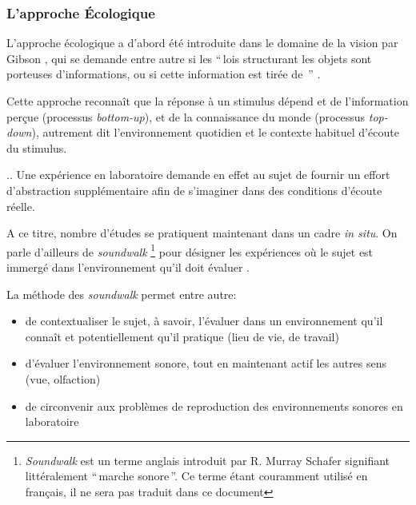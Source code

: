 \subsubsection{L'approche Écologique}
\label{sec:ecologique}

L'approche écologique a d'abord été introduite dans le domaine de la vision par Gibson \citep{gibson1966senses}, qui se demande entre autre si les ``\,lois structurant les objets sont porteuses d'informations, ou si cette information est tirée de \,'' \citep{gibson1978ecological}.

Cette approche reconnaît que la réponse à un stimulus dépend et de l'information perçue (processus \emph{bottom-up}), et de la connaissance du monde (processus \emph{top-down}), autrement dit l'environnement quotidien et le contexte habituel d'écoute du stimulus.

.. Une expérience en laboratoire demande en effet au sujet de fournir un effort d'abstraction supplémentaire afin de s’imaginer dans des conditions d'écoute réelle.

A ce titre, nombre d'études se pratiquent maintenant dans un cadre \emph{in situ}. On parle d'ailleurs de \emph{soundwalk}  \footnote{\emph{Soundwalk} est un terme anglais introduit par R. Murray Schafer \citep{schafer1969new} signifiant littéralement ``\,marche sonore\,''. Ce terme étant couramment utilisé en français, il ne sera pas traduit dans ce document} pour désigner les expériences où le sujet est immergé dans l'environnement qu'il doit évaluer \citep{adams2008soundwalking,jeon2013soundwalk}.

La méthode des \emph{soundwalk} permet entre autre:

\begin{itemize}
\item  de contextualiser le sujet, à savoir, l'évaluer dans un environnement qu'il connaît et potentiellement qu'il pratique (lieu de vie, de travail)
\item d'évaluer l'environnement sonore, tout en maintenant actif les autres sens (vue, olfaction)
\item de circonvenir aux problèmes de reproduction des environnements sonores en laboratoire
\end{itemize}

